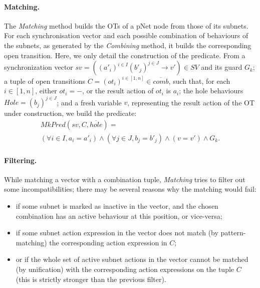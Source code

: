 \documentclass[smallcondensed]{svjour3}
\begin{document}



\paragraph{Matching.}
The \emph{Matching} method builds the OTs of a pNet node from those of
its subnets.
For each synchronisation vector and each possible
combination of behaviours of the subnets, as generated by the \emph
{Combining} method, it builds the corresponding open transition.
Here, we only detail the construction of the predicate.
From a synchronization vector
$sv = \left((a'_i)^{i\in I} (b'_j)^{j\in J}\rightarrow v'\right) \in SV$
and its guard $G_k$; a tuple of open transitions
$C = ({ot}_i)^{i \in [1,n]} \in \overline{comb}$, such that, for each $i \in [1,n]$, either $ot_i = -$, or the result action of $ot_i$ is $a_i$; the hole behaviours $\mathit{Hole} = (b_j)^{j \in J}$; and a fresh variable $v$, representing the result action of the OT under construction, we build the predicate:
%
\begin{multline*}
  \mathit{MkPred}(sv, C, \overline{\mathit{hole}}) = 
  \\
  (\forall i\in I, a_i=a'_i) \land
  (\forall j\in J, b_j=b'_j) \land
  (v=v') \land G_k.
\end{multline*}


\paragraph{Filtering.}
While matching a vector with a combination tuple, \emph{Matching}
tries to filter out some incompatibilities; there may be several
reasons why the matching would fail: 
\begin{itemize}
  \item if some subnet is marked as inactive in the vector, and the
    chosen combination has an active behaviour at this position, or vice-versa;
  \item if some subnet action expression in the vector does not match (by
    pattern-matching) the corresponding action expression in $C$;
  \item or if the whole set of active subnet actions in the vector
    cannot be matched (by unification) with the corresponding action expressions
      on the tuple $C$ (this is strictly stronger than the
      previous filter). 
\end {itemize}
\end{document}
